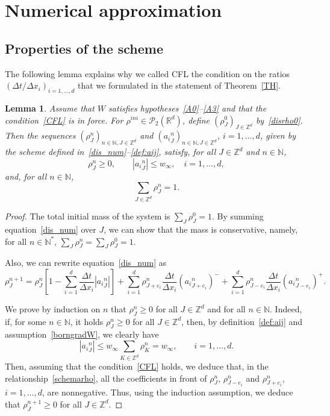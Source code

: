 \documentclass[11pt]{article}
\newtheorem{lemm}[theo]{Lemma}
\theoremstyle{definition}
\numberwithin{equation}{section}
\newcommand*\NN{\mathbb{N}}
\newcommand*\RR{\mathbb{R}}
\newcommand*\ZZ{\mathbb{Z}}
\newcommand*\calP{{\mathcal P}}
\begin{document}
\section{Numerical approximation}\label{sec:num}


\subsection{Properties of the scheme}

The following lemma explains why we called CFL the condition on the ratios $(\Delta t/\Delta x_{i})_{i=1,\dots,d}$ that we formulated in the statement of Theorem~\ref{TH}.

\begin{lemm}\label{lem:CFL}
Assume that $W$ satisfies hypotheses~\eqref{A0}--\eqref{A3} and that the condition~\eqref{CFL} is in force. For $\rho^{ini}\in \calP_2(\RR^d)$, define $(\rho_{J}^0)_{J \in \ZZ^d}$ by~\eqref{disrho0}. Then the sequences $(\rho_J^n)_{n \in \NN,J \in \ZZ^d}$ and $({a_i}_J^n)_{n \in \NN,J \in \ZZ^d}$, $i=1,\ldots,d$, given by the scheme defined in~\eqref{dis_num}--\eqref{def:aij}, satisfy, for all $J\in \ZZ^d$ and $n\in \NN$,
\[
\rho_{J}^n \geq 0, \qquad |{a_i}_{J}^n|\leq w_\infty, \quad i=1,\ldots, d,
\]
and, for all $n \in \NN$,
\begin{equation*}
\sum_{J \in \ZZ^d} \rho_{J}^n=1.
\end{equation*}
\end{lemm}

\begin{proof}
The total initial mass of the system is $\sum_{J} \rho_{J}^0=1$. By summing equation~\eqref{dis_num} over $J$, we can show that the mass is conservative, namely, for all $n\in \NN^*$, $\sum_{J} \rho_{J}^n=
\sum_{J} \rho_{J}^0=1$.

Also, we can rewrite equation~\eqref{dis_num} as
\begin{equation}
\rho_{J}^{n+1} = \rho_{J}^n \left[1 - \sum_{i=1}^d \frac{\Delta t}{\Delta x_i} |{a_i}^n_{J}| \right] + \sum_{i=1}^d \rho_{J+e_i}^n \frac{\Delta t}{\Delta x_i}({a_i}^n_{J+e_i})^- + \sum_{i=1}^d \rho_{J-e_i}^n \frac{\Delta t}{\Delta x_i}({a_i}^n_{J-e_i})^+.\label{schemarho}
\end{equation}

We prove by induction on $n$ that $\rho_{J}^n \geq 0$ for all $J \in \ZZ^d$ and for all $n \in {\mathbb N}$. Indeed, if, for some $n \in {\mathbb N}$, it holds $\rho_{J}^n \geq 0$ for all $J \in \ZZ^d$, then, by definition~\eqref{def:aij} and assumption~\eqref{borngradW}, we clearly have
\[
|{a_i}_{J}^{n}|\leq w_\infty \sum_{K\in \ZZ^d} \rho_{K}^n = w_\infty, \qquad i=1,\ldots,d.
\]
Then, assuming that the condition~\eqref{CFL} holds, we deduce that, in the relationship~\eqref{schemarho}, all the coefficients in front of $\rho_{J}^n$, $\rho_{J-e_i}^n$ and $\rho_{J+e_i}^n$, $i=1,\ldots,d$, are nonnegative. Thus, using the induction assumption, we deduce that $\rho_{J}^{n+1}\geq 0$ for all $J\in \ZZ^d$.
\end{proof}
\end{document}
